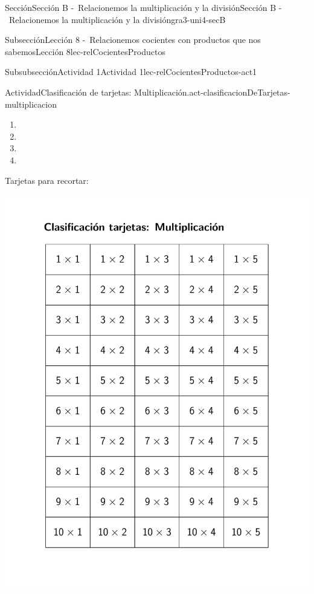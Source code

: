 \begin{sectionptx}{Sección}{Sección B -~Relacionemos la multiplicación y la división}{}{Sección B -~Relacionemos la multiplicación y la división}{}{}{gra3-uni4-secB}
\begin{subsectionptx}{Subsección}{Lección 8 -~Relacionemos cocientes con productos que nos sabemos}{}{Lección 8}{}{}{lec-relCocientesProductos}
\begin{subsubsectionptx}{Subsubsección}{Actividad 1}{}{Actividad 1}{}{}{lec-relCocientesProductos-act1}
\begin{activity}{Actividad}{Clasificación de tarjetas: Multiplicación.}{act-clasificacionDeTarjetas-multiplicacion}
\begin{enumerate}
\item{\vspace{0.5cm}}%
\item{\vspace{0.5cm}}%
\item{\vspace{0.5cm}}%
\item{\vspace{0.5cm}}%
\end{enumerate}
\end{activity}%
\begin{cutoutpage}
Tarjetas para recortar:
\par
\includegraphics[page=1, trim=70 80 80 100,clip, width=1.05\linewidth]{external/blm/tikz-source/clasificacionTarjetas-multiplicacion-blm.pdf}


\end{cutoutpage}
\end{subsubsectionptx}
\end{subsectionptx}
\end{sectionptx}
